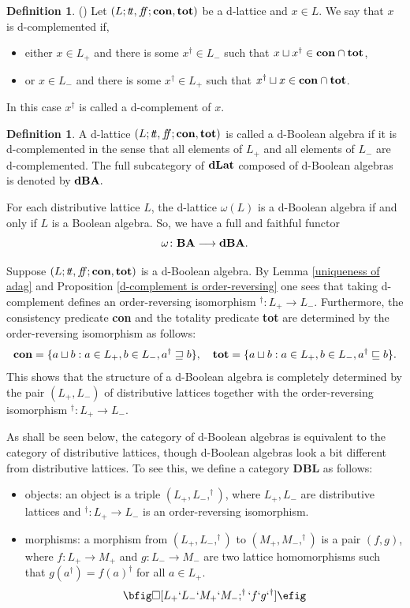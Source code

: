 \documentclass[11pt]{article}
\theoremstyle{plain}
\theoremstyle{definition}
\newtheorem{defn}[thm]{Definition}
\newcommand{\dbt}{{t\!t}}
\newcommand{\dbf}{{f\!\!f}}
\newcommand{\dLat}{\bf dLat}
\newcommand{\dBoo}{\bf dBA}
\newcommand{\lra}{\longrightarrow}
\begin{document}
\begin{defn}(\cite[Definition 2.2.2]{Klinke})
Let $(L;\dbt,\dbf;{\bf con},{\bf tot})$ be a d-lattice and $x\in L$. We say that $x$ is  d-complemented if,  \begin{itemize} \setlength{\itemsep}{0pt} \item either $x\in L_+$ and there is  some   $x^\dag\in L_-$ such that $x\sqcup x^\dag\in{\bf con} \cap {\bf tot}$, \item or $x\in L_-$ and there is some  $x^\dag\in L_+$ such that $x^\dag\sqcup x\in{\bf con} \cap {\bf tot}$. \end{itemize}  In this case $x^\dag$ is called a  d-complement of $x$. \end{defn}

\begin{defn} \label{defn of d-boolean} A d-lattice $(L;\dbt,\dbf; {\bf con}, {\bf tot})$ is called a d-Boolean algebra if it is d-complemented in the sense that all elements of $L_+$ and all elements  of $L_-$ are d-complemented. 
The full subcategory of $\dLat$ composed of d-Boolean algebras is denoted by  $\dBoo.$ \end{defn}  

For each distributive lattice $L$, the d-lattice $\omega(L)$ is a d-Boolean algebra if and only if $L$ is a Boolean algebra. So, we have a full and faithful functor $$\omega\colon{\bf BA}\lra{\bf dBA}.$$   

Suppose $(L;\dbt,\dbf;{\bf con},{\bf tot})$ is a  d-Boolean algebra. By Lemma \ref{uniqueness of adag} and Proposition \ref{d-complement is order-reversing} one sees that taking d-complement defines an order-reversing isomorphism $ ^\dagger\colon L_+\lra L_-$. Furthermore, the consistency predicate {\bf con} and the totality predicate {\bf tot} are determined by the order-reversing isomorphism as follows:  $${\bf con}=\{a\sqcup b: a\in L_+, b\in  L_-, a^\dag\sqsupseteq b \},\quad  {\bf tot}=\{a\sqcup b: a\in L_+, b\in  L_-,a^\dag\sqsubseteq b\}.$$ This shows that the structure of a d-Boolean algebra is completely determined by the pair $(L_+, L_-)$ of distributive lattices together with the order-reversing isomorphism $^\dagger\colon L_+\lra L_-$.  

As shall be seen below, the category of d-Boolean algebras is equivalent to the category of distributive lattices, though d-Boolean algebras look a bit different from distributive lattices. To see this, we define a category {\bf DBL} as follows: \begin{itemize}\setlength{\itemsep}{0pt} \item objects: an object is a triple $(L_+,L_-, ^\dag)$, where $L_+,L_-$ are distributive lattices and $ ^\dag\colon L_+\lra L_-$ is an order-reversing isomorphism. \item morphisms: a morphism from $(L_+,L_-, ^\dag)$ to $(M_+,M_-, ^\dag)$ is a pair $(f,g)$, where $f\colon L_+\lra M_+$ and $g\colon L_-\lra M_-$ are two lattice homomorphisms such that $g(a^\dag)=f(a)^\dag$ for all $a\in L_+$. $$\bfig\square[L_+` L_-`M_+` M_-; ^\dag`f`g` ^\dag] \efig $$\end{itemize}
\end{document}
